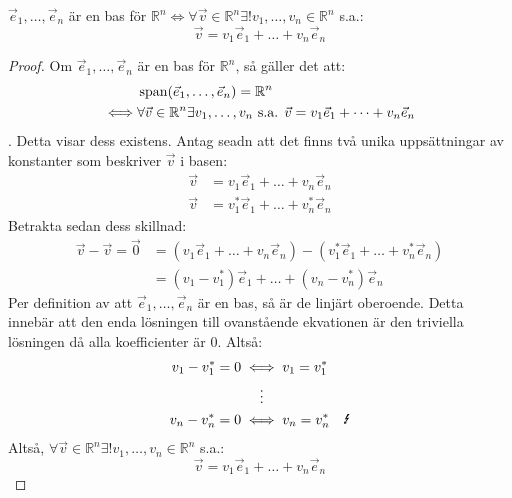 \begin{lemma}
	$\vec{e}_1,\dots,\vec{e}_n$ är en bas för $\mathbb{R}^n\iff\forall\vec{v}\in\mathbb{R}^n
	\exists!v_1,\dots,v_n\in\mathbb{R}^n$ s.a.:
	$$
		\vec{v}=v_1\vec{e}_1+\dots+v_n\vec{e}_n
	$$

	\begin{proof}
		Om $\vec{e}_1,\dots,\vec{e}_n$ är en bas för $\mathbb{R}^n$, så gäller det att:
		\begin{align*}
			&\operatorname{span}(\vec{e}_1,\dots,\vec{e}_n)=\mathbb{R}^n\\
			\iff&\forall\vec{v}\in\mathbb{R}^n\exists v_1,\dots,v_n\text{ s.a. }\vec{v}=v_1\vec{e}_1+\dots+v_n\vec{e}_n
		\end{align*}.
		Detta visar dess existens. Antag seadn att det finns två unika uppsättningar
		av konstanter som beskriver $\vec{v}$ i basen:
		\begin{align*}
			\vec{v}&=v_1\vec{e}_1+\dots+v_n\vec{e}_n\\
			\vec{v}&=v_1^*\vec{e}_1+\dots+v_n^*\vec{e}_n
		\end{align*}
		Betrakta sedan dess skillnad:
		\begin{align*}
			\vec{v}-\vec{v}=\vec{0}
			&=(v_1\vec{e}_1+\dots+v_n\vec{e}_n)-(v_1^*\vec{e}_1+\dots+v_n^*\vec{e}_n)\\
			&=(v_1-v_1^*)\vec{e}_1+\dots+(v_n-v_n^*)\vec{e}_n
		\end{align*}
		Per definition av att $\vec{e}_1,\dots,\vec{e}_n$ är en bas, så är de
		linjärt oberoende. Detta innebär att den enda lösningen till ovanstående
		ekvationen är den triviella lösningen då alla koefficienter är $0$. Altså:
		\begin{align*}
			v_1-v_1^*=0&\iff v_1=v_1^*\\
			&\quad\,\,\vdots\\
			v_n-v_n^*=0&\iff v_n=v_n^*\quad\contra
		\end{align*}
		Altså, $\forall\vec{v}\in\mathbb{R}^n\exists!v_1,\dots,v_n\in\mathbb{R}^n$ s.a.:
		$$
			\vec{v}=v_1\vec{e}_1+\dots+v_n\vec{e}_n
		$$
	\end{proof}
\end{lemma}